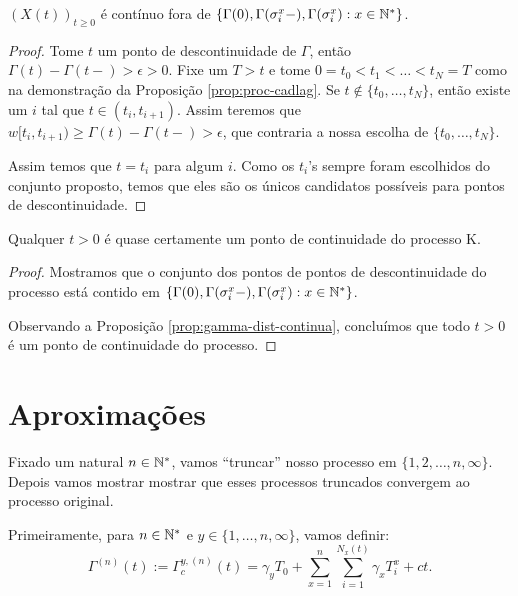 \begin{proposicao}
  \label{prop:proc-descontinuidades}
  $(X(t))_{t\geq 0}$ é \qc contínuo fora de $\{ \Gamma(0),
  \Gamma(\sigma_i^x-), \Gamma(\sigma_i^x): x \in {\mathbb{N^*}}\}$.
\end{proposicao}
\begin{proof}
  Tome $t$ um ponto de descontinuidade de $\Gamma$, então $\Gamma(t) -
  \Gamma(t-) > \epsilon > 0$. Fixe um $T > t$ e tome $0 = t_0 < t_1 <
  \ldots < t_N = T$ como na demonstração da Proposição
  \ref{prop:proc-cadlag}. Se $t \not\in \{t_0, \ldots, t_N\}$, então
  existe um $i$ tal que $t \in (t_i, t_{i+1})$. Assim teremos que
  $w[t_i, t_{i+1}) \geq \Gamma(t) - \Gamma(t-) > \epsilon$, que
  contraria a nossa escolha de $\{t_0, \ldots, t_N\}$.

  Assim temos que $t = t_i$ para algum $i$. Como os $t_i$'s sempre
  foram escolhidos do conjunto proposto, temos que eles são os únicos
  candidatos possíveis para pontos de descontinuidade.
\end{proof}

\begin{corolario}
  \label{cor:continuidades-processo}
  Qualquer $t > 0$ é quase certamente um ponto de continuidade do
  processo K.
\end{corolario}
\begin{proof}
  Mostramos que o conjunto dos pontos de pontos de descontinuidade do
  processo está contido em $\{ \Gamma(0), \Gamma(\sigma_i^x-),
  \Gamma(\sigma_i^x): x \in {\mathbb{N^*}}\}$.

  Observando a Proposição \ref{prop:gamma-dist-continua}, concluímos
  que todo $t > 0$ é um ponto de continuidade do processo.
\end{proof}



\section{Aproximações}
\label{sec:aproximacoes}

Fixado um natural $n \in {\mathbb{N^*}}$, vamos ``truncar'' nosso processo em
$\{1, 2, \ldots, n, \infty\}$. Depois vamos mostrar mostrar que esses
processos truncados convergem ao processo original.

Primeiramente, para $n \in {\mathbb{N^*}}$ e $y \in \{1, \ldots, n, \infty\}$,
vamos definir:
\begin{equation}
  \Gamma^{(n)} (t) := \Gamma^{y,(n)}_c (t) = \gamma_y T_0
  + \sum_{x =1}^{n} \sum_{i = 1}^{N_x(t)}
  \gamma_x T_i^x
  + ct.
\end{equation}

